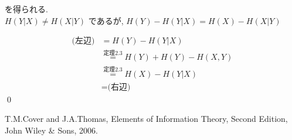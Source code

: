 \documentclass[a4j]{jsarticle}
\begin{document}
を得られる.\\

 $H(Y|X) \neq H(X|Y)$ であるが, $H(Y) - H(Y|X) = H(X) - H(X|Y)$

\begin{align}
	\mbox{(左辺)} & = H(Y) - H(Y|X)                                       \\
	              & \stackrel{\mathrm{定理 2.3}}{=} H(Y) + H(Y) - H(X, Y) \\
	              & \stackrel{\mathrm{定理 2.3}}{=} H(X) -H(Y|X)          \\
	              & = \mbox{(右辺)}
\end{align}\qed

\begin{thebibliography}{99}
	T.M.Cover and J.A.Thomas, Elements of Information Theory, Second Edition, John Wiley \& Sons, 2006.
\end{thebibliography}
\end{document}
